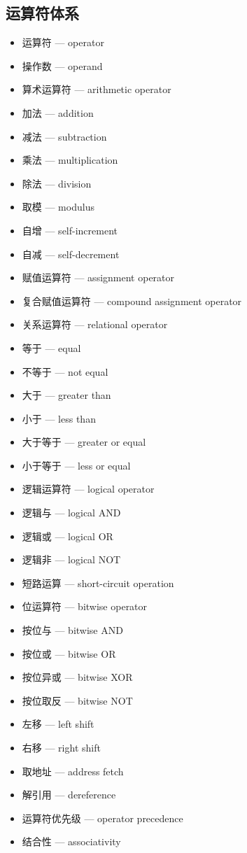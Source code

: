 \subsection{运算符体系}
\begin{itemize}
\item 运算符 — operator
\item 操作数 — operand
\item 算术运算符 — arithmetic operator
\item 加法 — addition
\item 减法 — subtraction
\item 乘法 — multiplication
\item 除法 — division
\item 取模 — modulus
\item 自增 — self-increment
\item 自减 — self-decrement
\item 赋值运算符 — assignment operator
\item 复合赋值运算符 — compound assignment operator
\item 关系运算符 — relational operator
\item 等于 — equal
\item 不等于 — not equal
\item 大于 — greater than
\item 小于 — less than
\item 大于等于 — greater or equal
\item 小于等于 — less or equal
\item 逻辑运算符 — logical operator
\item 逻辑与 — logical AND
\item 逻辑或 — logical OR
\item 逻辑非 — logical NOT
\item 短路运算 — short-circuit operation
\item 位运算符 — bitwise operator
\item 按位与 — bitwise AND
\item 按位或 — bitwise OR
\item 按位异或 — bitwise XOR
\item 按位取反 — bitwise NOT
\item 左移 — left shift
\item 右移 — right shift
\item 取地址 — address fetch
\item 解引用 — dereference
\item 运算符优先级 — operator precedence
\item 结合性 — associativity
\end{itemize}

